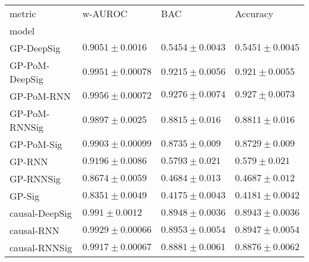 \begin{tabular}{llll}
\toprule
metric &                                          w-AUROC &                                             BAC &                                        Accuracy \\
model          &                                                  &                                                 &                                                 \\
\midrule
GP-DeepSig     &                            $ 0.9051 \pm 0.0016 $ &                           $ 0.5454 \pm 0.0043 $ &                           $ 0.5451 \pm 0.0045 $ \\
GP-PoM-DeepSig &                           $ 0.9951 \pm 0.00078 $ &                           $ 0.9215 \pm 0.0056 $ &                            $ 0.921 \pm 0.0055 $ \\
GP-PoM-RNN     &                           $ 0.9956 \pm 0.00072 $ &            $  \underline{ 0.9276 \pm 0.0074 } $ &             $  \underline{ 0.927 \pm 0.0073 } $ \\
GP-PoM-RNNSig  &                            $ 0.9897 \pm 0.0025 $ &                            $ 0.8815 \pm 0.016 $ &                            $ 0.8811 \pm 0.016 $ \\
GP-PoM-Sig     &                           $ 0.9903 \pm 0.00099 $ &                            $ 0.8735 \pm 0.009 $ &                            $ 0.8729 \pm 0.009 $ \\
GP-RNN         &                            $ 0.9196 \pm 0.0086 $ &                            $ 0.5793 \pm 0.021 $ &                             $ 0.579 \pm 0.021 $ \\
GP-RNNSig      &                            $ 0.8674 \pm 0.0059 $ &                            $ 0.4684 \pm 0.013 $ &                            $ 0.4687 \pm 0.012 $ \\
GP-Sig         &                            $ 0.8351 \pm 0.0049 $ &                           $ 0.4175 \pm 0.0043 $ &                           $ 0.4181 \pm 0.0042 $ \\
causal-DeepSig &                             $ 0.991 \pm 0.0012 $ &                           $ 0.8948 \pm 0.0036 $ &                           $ 0.8943 \pm 0.0036 $ \\
causal-RNN     &                           $ 0.9929 \pm 0.00066 $ &                           $ 0.8953 \pm 0.0054 $ &                           $ 0.8947 \pm 0.0054 $ \\
causal-RNNSig  &                           $ 0.9917 \pm 0.00067 $ &                           $ 0.8881 \pm 0.0061 $ &                           $ 0.8876 \pm 0.0062 $ \\

\end{tabular}
